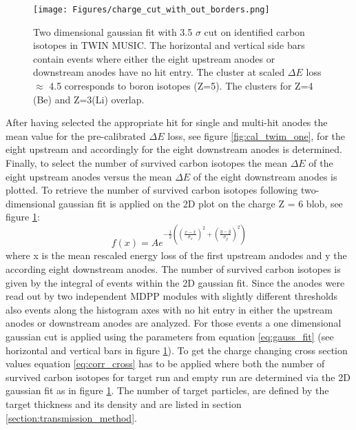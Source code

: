 \begin{figure}[htpb]
    \centering
    \texttt{[image: Figures/charge\_cut\_with\_out\_borders.png]}
    \caption{
    Two dimensional gaussian fit with 3.5 $\sigma$ cut  on identified carbon isotopes in TWIN MUSIC. The horizontal and vertical side bars contain events where either the eight upstream anodes or downstream anodes have no hit entry. The cluster at scaled $\Delta E$ loss $\approx$ 4.5 corresponds to boron isotopes (Z=5). The clusters for Z=4 (Be) and Z=3(Li) overlap.
    }
    \label{fig:twin_2d_gaus_cut}
\end{figure}

After having selected the appropriate hit for single and multi-hit anodes the mean value for the pre-calibrated $\Delta E$ loss, see figure \ref{fig:cal_twim_one}, for the eight upstream and accordingly for the eight downstream anodes is determined. Finally, to select the number of survived carbon isotopes the mean $\Delta E$ of the eight upstream anodes versus the mean $\Delta E$ of the eight downstream anodes is plotted. To retrieve the number of survived carbon isotopes following two-dimensional gaussian fit is applied on the 2D plot on the charge Z = 6 blob, see figure \ref{fig:twin_2d_gaus_cut}:
\begin{equation}
f(x) = A e^{-\frac{1}{2}((\frac{x - \bar{x}}{\sigma_{x}})^2 +(\frac{y - \bar{y}}{\sigma_{y}})^2)}
\label{eq:gauss_fit}
\end{equation}
where x is the mean rescaled energy loss of the first upstream andodes and y the according eight downstream anodes. The number of survived carbon isotopes is given by the integral of events within the 2D gaussian fit. Since the anodes were read out by two independent MDPP modules with slightly different thresholds also events along the histogram axes with no hit entry in either the upstream anodes or downstream anodes are analyzed. For those events a one dimensional gaussian cut is applied using the parameters from equation \ref{eq:gauss_fit} (see horizontal and vertical bars in figure \ref{fig:twin_2d_gaus_cut}).\newline
To get the charge changing cross section values equation \ref{eq:corr_cross} has to be applied where both the number of survived  carbon isotopes for target run and empty run are determined via the 2D gaussian fit as in figure \ref{fig:twin_2d_gaus_cut}. The number of target particles, are defined by the target thickness and its density and are listed in section \ref{section:transmission_method}. 
